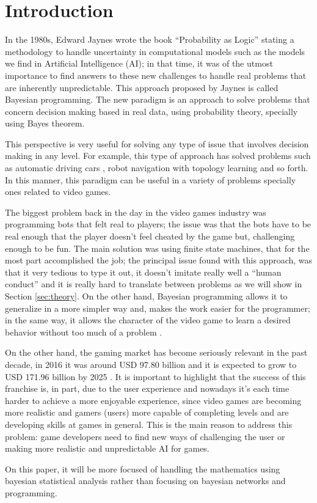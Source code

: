 \section{Introduction}
In the 1980s, Edward Jaynes wrote the book ``Probability as Logic'' stating a methodology to handle uncertainty in computational models such as the models we find in Artificial Intelligence (AI); in that time, it was of the utmost importance to find answers to these new challenges to handle real problems that are inherently unpredictable. This approach proposed by Jaynes is called Bayesian programming. The new paradigm is an approach to solve problems that concern decision making based in real data, using probability theory, specially using Bayes theorem.

This perspective is very useful for solving any type of issue that involves decision making in any level. For example, this type of approach has solved problems such as automatic driving cars \cite{coue2003using}, robot navigation with topology learning \cite{tapus2004topology} and so forth. In this manner, this paradigm can be useful in a variety of problems specially ones related to video games.

The biggest problem back in the day in the video games industry was programming bots that felt real to players; the issue was that the bots have to be real enough that the player doesn't feel cheated by the game but, challenging enough to be fun. The main solution was using finite state machines, that for the most part accomplished the job; the principal issue found with this approach, was that it very tedious to type it out, it doesn't imitate really well a ``human conduct'' and it is really hard to translate between problems as we will show in Section \ref{sec:theory}. On the other hand, Bayesian programming allows it to generalize in a more simpler way and, makes the work easier for the programmer; in the same way, it allows the character of the video game to learn a desired behavior without too much of a problem \cite{le2004teaching}.

On the other hand, the gaming market has become seriously relevant in the past decade, in 2016 it was around USD 97.80 billion and it is expected to grow to USD 171.96 billion by 2025 \cite{gamingMarket}. It is important to highlight that the success of this franchise is, in part, due to the user experience and nowadays it's each time harder to achieve a more enjoyable experience, since video games are becoming more realistic and gamers (users) more capable of completing levels and are developing skills at games in general. This is the main reason to address this problem: game developers need to find new ways of challenging the user or making more realistic and unpredictable AI for games.

On this paper, it will be more focused of handling the mathematics using bayesian statistical analysis rather than focusing on bayesian networks and programming.